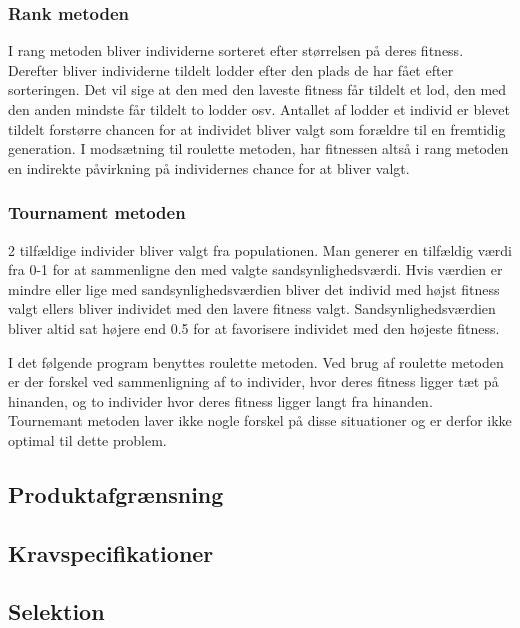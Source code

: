 \subsubsection{Rank metoden}

I rang metoden bliver individerne sorteret efter størrelsen på deres fitness. Derefter bliver individerne tildelt lodder efter den plads de har fået efter sorteringen. Det vil sige at den med den laveste fitness får tildelt et lod, den med den anden mindste får tildelt to lodder osv. Antallet af lodder et individ er blevet tildelt forstørre chancen for at individet bliver valgt som forældre til en fremtidig generation. I modsætning til roulette metoden, har fitnessen altså i rang metoden en indirekte påvirkning på individernes chance for at bliver valgt. 

\subsubsection{Tournament metoden}

2 tilfældige individer bliver valgt fra populationen. Man generer en tilfældig værdi fra 0-1 for at sammenligne den med valgte sandsynlighedsværdi. Hvis værdien er mindre eller lige med sandsynlighedsværdien bliver det individ med højst fitness valgt ellers bliver individet med den lavere fitness valgt. Sandsynlighedsværdien bliver altid sat højere end 0.5 for at favorisere individet med den højeste fitness. 

I det følgende program benyttes roulette metoden. Ved brug af roulette metoden er der forskel ved sammenligning af to individer, hvor deres fitness ligger tæt på hinanden, og to individer hvor deres fitness ligger langt fra hinanden. Tournemant metoden laver ikke nogle forskel på disse situationer og er derfor ikke optimal til dette problem.

\subsection{Produktafgrænsning}
  

\subsection{Kravspecifikationer}
  

\subsection{Selektion}
  